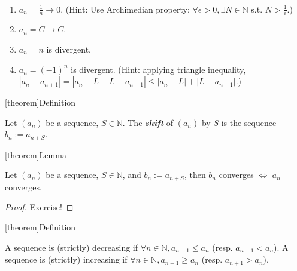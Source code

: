 \documentclass[12pt]{report}
\theoremstyle{definition}
\begin{document}
\begin{ex}
    \,

    \begin{enumerate}[label = (\arabic*)]
        \item $a_n = \frac{1}{n} \rightarrow{} 0$.
            (Hint: Use Archimedian property: $\forall \epsilon > 0, \exists N \in \mathbb{N}$
            s.t. $N > \frac{1}{\epsilon}$.)
            
        \item $a_n = C \rightarrow{} C$.

        \item $a_n = n$ is divergent.

        \item $a_n = {(-1)}^{n}$ is divergent.
            (Hint: applying triangle inequality, $|a_n - a_{n + 1}| = 
            |a_n - L + L - a_{n + 1}| \le |a_n - L| + |L - a_{n - 1}|$.)
    \end{enumerate}
    
\end{ex}

[theorem]{Definition}
\begin{shift of (an)}
    Let $(a_n)$ be a sequence, $S \in \mathbb{N}$.
    The \textbf{\emph{shift}} of $(a_n)$ by $S$ is the sequence $b_n := a_{n+S}$.
\end{shift of (an)}

[theorem]{Lemma}
\begin{shift of (an) converges if (an) converges}
    Let $(a_n)$ be a sequence, $S \in \mathbb{N}$, and $b_n := a_{n + S}$, then
    $b_n$ converges $\iff$ $a_n$ converges.
\end{shift of (an) converges if (an) converges}

\begin{proof}
    Exercise!
\end{proof}

[theorem]{Definition}
\begin{increasing and decreasing sequence}
    A sequence is (strictly) decreasing if $\forall n\in \mathbb{N}, a_{n + 1}\le a_n$ (resp. $a_{n + 1} < a_n$).
    A sequence is (strictly) increasing if $\forall n \in \mathbb{N}, a_{n + 1}\ge a_n$ (resp. $a_{n + 1} > a_n$).
\end{increasing and decreasing sequence}
\end{document}
